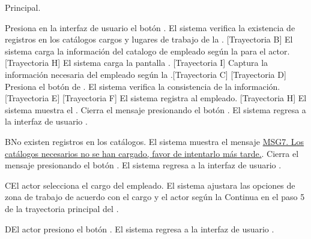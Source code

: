 \begin{UCtrayectoria}{Principal.}
	
	\UCpaso[\UCactor] Presiona en la interfaz de usuario  el botón \IUbutton{+}.
	\UCpaso  El sistema verifica la existencia de registros en los catálogos cargos  y  lugares de trabajo de la  . [Trayectoria B] 
	\UCpaso El sistema carga la información del catalogo de empleado  según la  para el actor. [Trayectoria H]
	\UCpaso El sistema carga la pantalla  . [Trayectoria I]
	\UCpaso[\UCactor] Captura la información necesaria del empleado según la  .[Trayectoria C] [Trayectoria D] 
	\UCpaso[\UCactor]  Presiona el botón de .
	\UCpaso El sistema verifica la consistencia de la información. [Trayectoria E] [Trayectoria F]
	\UCpaso El sistema registra al empleado. [Trayectoria H]
	\UCpaso  El sistema muestra el .    
	\UCpaso[\UCactor] Cierra el mensaje presionando el botón .
	\UCpaso El sistema regresa a la interfaz de usuario .
\end{UCtrayectoria}


\begin{UCtrayectoriaA}{B}{No existen registros en los catálogos.}
	\UCpaso El sistema muestra el mensaje \hyperref[MSG7]{MSG7. Los catálogos necesarios no se han cargado, favor de intentarlo más tarde.}.
	\UCpaso[\UCactor] Cierra el mensaje presionando el botón .
	\UCpaso El sistema regresa a la interfaz de usuario .
\end{UCtrayectoriaA}

\begin{UCtrayectoriaA}{C}{El actor selecciona el cargo del empleado.}
	\UCpaso     El sistema ajustara las opciones de zona de trabajo de acuerdo con el cargo y el actor según la 
	\UCpaso Continua en el paso 5 de la trayectoria principal del .
\end{UCtrayectoriaA}

\begin{UCtrayectoriaA}{D}{El actor presiono el botón .}
	\UCpaso El sistema regresa a la interfaz de usuario .
\end{UCtrayectoriaA}

